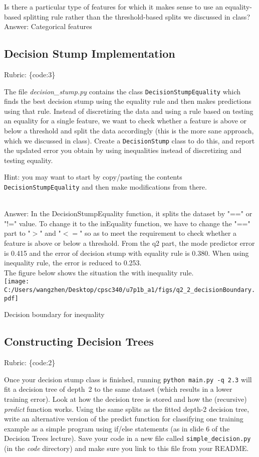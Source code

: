 \documentclass{article}
\def\blu#1{{\color{blu}#1}}
\def\gre#1{{\color{gre}#1}}
\def\rubric#1{\gre{Rubric: \{#1\}}}{}
\begin{document}
Is there a particular type of features for which it makes sense to use an equality-based splitting rule rather than the threshold-based splits we discussed in class?
\textcolor{gre}{
\\Answer:
Categorical features
}

\subsection{Decision Stump Implementation}
\rubric{code:3}

The file \emph{decision\_stump.py} contains the class \texttt{DecisionStumpEquality} which finds the best decision stump using the equality rule and then makes predictions using that rule. Instead of discretizing the data and using a rule based on testing an equality for a single feature, we want to check whether a feature is above or below a threshold and split the data accordingly (this is the more sane approach, which we discussed in class). \blu{Create a \texttt{DecisionStump} class to do this, and report the updated error you obtain by using inequalities instead of discretizing and testing equality.}

Hint: you may want to start by copy/pasting the contents \texttt{DecisionStumpEquality} and then make modifications from there.
\textcolor{gre}{
\\Answer:
In the DecisionStumpEquality function, it splits the dataset by "==" or "!=" value. To change it to the inEquality function, we have to change the "==" part to "$>$" and "$<=$" so as to meet the requirement to check whether a feature is above or below a threshold.
From the q2 part, the mode predictor error is 0.415 and the error of decision stump with equality rule is 0.380.
When using inequality rule, the error is reduced to 0.253.
\\The figure below shows the situation the with inequality rule.\\
\texttt{[image: C:/Users/wangzhen/Desktop/cpsc340/u7p1b\_a1/figs/q2\_2\_decisionBoundary.pdf]}
\caption{Decision boundary for inequality}
}

\subsection{Constructing Decision Trees}
\rubric{code:2}

Once your decision stump class is finished, running \texttt{python main.py -q 2.3} will fit
a decision tree of depth~2 to the same dataset (which results in a lower training error).
Look at how the decision tree is stored and how the (recursive) \emph{predict} function works.
\blu{Using the same splits as the fitted depth-2 decision tree, write an alternative version of the predict
function for classifying one training example as a simple program using if/else statements
(as in slide 6 of the Decision Trees lecture).} Save your code in a new file called
\texttt{simple\string_decision.py} (in the \emph{code} directory) and make sure you link to this file from your README.
\end{document}
